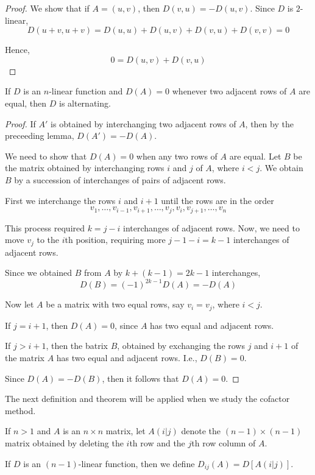 \begin{proof}
	We show that if $A=(u,v)$, then $D(v,u) = -D(u,v)$. Since $D$ is $2$-linear,
	\[
		D(u+v, u+v) = D(u,u) + D(u,v) + D(v,u) + D(v,v) = 0
	\]

	Hence,
	\[
		0 = D(u,v) + D(v,u)
	\]
\end{proof}

\begin{lemma}
	If $D$ is an $n$-linear function and $D(A) = 0$ whenever two adjacent rows of $A$ are equal, then $D$ is alternating.
\end{lemma}

\begin{proof}
	If $A'$ is obtained by interchanging two adjacent rows of $A$, then by the preceeding lemma, $D(A') = -D(A)$. 

	We need to show that $D(A) = 0$ when any two rows of $A$ are equal. Let $B$ be the matrix obtained by interchanging rows $i$ and $j$ of $A$, where $i < j$. We obtain $B$ by a succession of interchanges of pairs of adjacent rows.

	First we interchange the rows $i$ and $i+1$ until the rows are in the order
	\[
		v_1, \ldots, v_{i-1}, v_{i+1}, \ldots, v_j, v_i, v_{j+1}, \ldots, v_n
	\]
	
	This process required $k = j-i$ interchanges of adjacent rows. Now, we need to move $v_j$ to the $i$th position, requiring more $j-1-i = k-1$ interchanges of adjacent rows.

	Since we obtained $B$ from $A$ by $k+(k-1) = 2k-1$ interchanges,
	\[
		D(B) = (-1)^{2k-1}D(A) = -D(A)
	\]

	Now let $A$ be a matrix with two equal rows, say $v_i = v_j$, where $i < j$.
	
	If $j = i+1$, then $D(A) = 0$, since $A$ has two equal and adjacent rows.

	If $j > i+1$, then the batrix $B$, obtained by exchanging the rows $j$ and $i+1$ of the matrix $A$ has two equal and adjacent rows. I.e., $D(B) = 0$.

	Since $D(A) = -D(B)$, then it follows that $D(A) = 0$.
\end{proof}

The next definition and theorem will be applied when we study the cofactor method.

\begin{definition}
	If $n>1$ and $A$ is an $n \times n$ matrix, let $A(i|j)$ denote the $(n-1) \times (n-1)$ matrix obtained by deleting the $i$th row and the $j$th row column of $A$. 

	If $D$ is an $(n-1)$-linear function, then we define $D_{ij}(A) = D[A(i|j)]$.
\end{definition}

